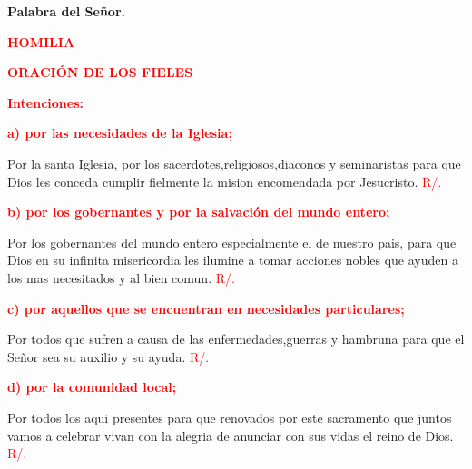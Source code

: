 \documentclass[12pt, letterpaper]{report}
\begin{document}
{\bfseries Palabra del Se\~nor.} \newline

\Large {\bfseries \textcolor{red}{HOMILIA}} \newline

\newpage

\Large {\bfseries \textcolor{red}{ORACI\'ON DE LOS FIELES}} \newline

\large {\bfseries \textcolor{red}{Intenciones:}} \newline

\large {\bfseries \textcolor{red}{a) por las necesidades de la Iglesia;}} \newline

\Large Por la santa Iglesia, por los sacerdotes,religiosos,diaconos y seminaristas para que Dios les conceda cumplir fielmente la mision encomendada por Jesucristo. \hspace{1cm} \textcolor{red}{R/.}\newline

\large {\bfseries \textcolor{red}{b) por los gobernantes y por la salvaci\'on del mundo entero;}} \newline

\Large Por los gobernantes del mundo entero especialmente el de nuestro pais, para que Dios en su infinita misericordia les ilumine a tomar acciones nobles que ayuden a los mas necesitados y al bien comun. \hspace{1cm} \textcolor{red}{R/.}\newline

\large {\bfseries \textcolor{red}{c) por aquellos que se encuentran en necesidades particulares;}} \newline

\Large Por todos que sufren a causa de las enfermedades,guerras y hambruna para que el Se\~nor sea su auxilio y su ayuda. \hspace{1cm} \textcolor{red}{R/.}\newline

\large {\bfseries \textcolor{red}{d) por la comunidad local;}} \newline

\Large Por todos los aqui presentes para que renovados por este sacramento que juntos vamos a celebrar vivan con la alegria de anunciar con sus vidas el reino de Dios. \hspace{1cm} \textcolor{red}{R/.}\newline
\end{document}
